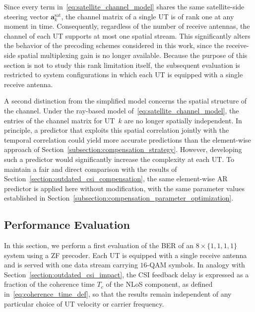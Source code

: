 Since every term in~\eqref{eq:satellite_channel_model} shares the same satellite-side steering vector $\mathbf{a}^{\mathrm{sat}}_k$, the channel matrix of a single \ac{UT} is of rank one at any moment in time.
Consequently, regardless of the number of receive antennas, the channel of each \ac{UT} supports at most one spatial stream.
This significantly alters the behavior of the precoding schemes considered in this work, since the receive-side spatial multiplexing gain is no longer available.
Because the purpose of this section is not to study this rank limitation itself, the subsequent evaluation is restricted to system configurations in which each \ac{UT} is equipped with a single receive antenna.

A second distinction from the simplified model concerns the spatial structure of the channel.
Under the ray-based model of~\eqref{eq:satellite_channel_model}, the entries of the channel matrix for \ac{UT}~$k$ are no longer spatially independent.
In principle, a predictor that exploits this spatial correlation jointly with the temporal correlation could yield more accurate predictions than the element-wise approach of Section~\ref{subsection:compensation_strategy}.
However, developing such a predictor would significantly increase the complexity at each \ac{UT}.
To maintain a fair and direct comparison with the results of Section~\ref{section:outdated_csi_compensation}, the same element-wise \ac{AR} predictor is applied here without modification, with the same parameter values established in Section~\ref{subsection:compensation_parameter_optimization}.

\subsection{Performance Evaluation}
\label{subsection:performance_evaluation}

In this section, we perform a first evaluation of the \ac{BER} of an $8 \times \{1,1,1,1\}$ system using a \ac{ZF} precoder. Each \ac{UT} is equipped with a single receive antenna and is served with one data stream carrying $16$-\ac{QAM} symbols.
In analogy with Section~\ref{section:outdated_csi_impact}, the \ac{CSI} feedback delay is expressed as a fraction of the coherence time $T_c$ of the \ac{NLoS} component, as defined in~\eqref{eq:coherence_time_def}, so that the results remain independent of any particular choice of \ac{UT} velocity or carrier frequency.

